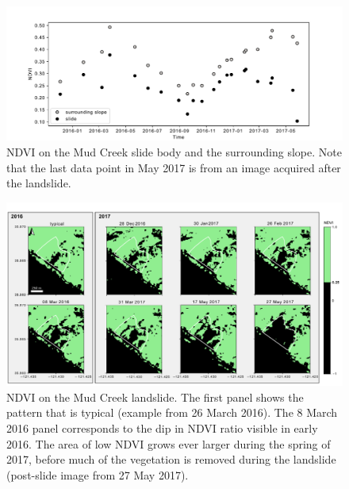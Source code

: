 \documentclass[nhess, manuscript]{copernicus}
\begin{document}
\begin{figure}[hbt!]
    \centering
    \includegraphics[scale = 0.5]{NDVI_noratio.pdf}
    \caption{NDVI on the Mud Creek slide body and the surrounding slope. Note that the last data point in May 2017 is from an image acquired after the landslide.}
    \label{fig:ndvi_noratio}
\end{figure}

\begin{figure}[hbt!]
    \centering
    \includegraphics[scale = 0.5]{ndvi_patterns_fig_0.25.pdf}
    \caption{NDVI on the Mud Creek landslide. The first panel shows the pattern that is typical (example from 26 March 2016). The 8 March 2016 panel corresponds to the dip in NDVI ratio visible in early 2016. The area of low NDVI grows ever larger during the spring of 2017, before much of the vegetation is removed during the landslide (post-slide image from 27 May 2017).}
    \label{fig:ndvi_pattern}
\end{figure}
\end{document}
